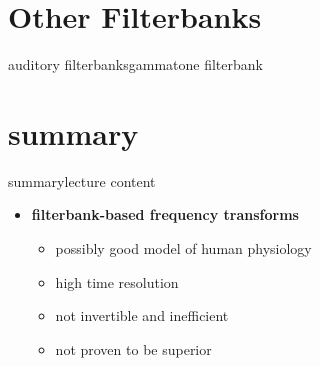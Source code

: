     \section[resonance]{Other Filterbanks}
        \begin{frame}{auditory filterbanks}{gammatone filterbank}
        \end{frame}	

    \section{summary}
        \begin{frame}{summary}{lecture content}
            \begin{itemize}
                \item      \textbf{filterbank-based frequency transforms}
                    \begin{itemize}
                        \item   possibly good model of human physiology
                        \item   high time resolution
                        \item   not invertible and inefficient
                        \item   not proven to be superior
                    \end{itemize}
            \end{itemize}
        \end{frame}

